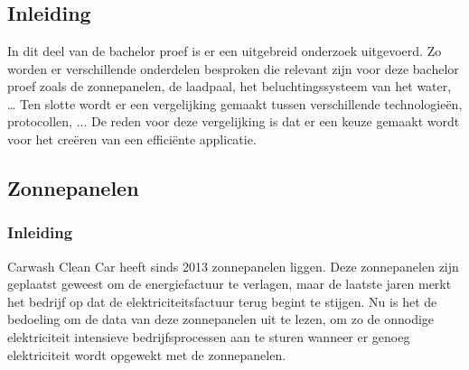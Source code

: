 \chapter{}%
\label{ch:stand-van-zaken}



\section{Inleiding}
\label{sec:stand-van-zaken-inleiding}

In dit deel van de bachelor proef is er een uitgebreid onderzoek uitgevoerd. Zo worden er verschillende onderdelen besproken die relevant zijn voor deze bachelor proef zoals de zonnepanelen, de laadpaal, het beluchtingssysteem van het water, … Ten slotte wordt er een vergelijking gemaakt tussen verschillende technologieën, protocollen, ... De reden voor deze vergelijking is dat er een keuze gemaakt wordt voor het creëren van een efficiënte applicatie.

\section{Zonnepanelen}
\label{sec:stand-van-zaken-zonnepanelen}

\subsection{Inleiding}
\label{sec:stand-van-zaken-zonnepanelen-inleiding}

Carwash Clean Car heeft sinds 2013 zonnepanelen liggen. Deze zonnepanelen zijn geplaatst geweest om de energiefactuur te verlagen, maar de laatste jaren merkt het bedrijf op dat de elektriciteitsfactuur terug begint te stijgen. Nu is het de bedoeling om de data van deze zonnepanelen uit te lezen, om zo de onnodige elektriciteit intensieve bedrijfsprocessen aan te sturen wanneer er genoeg elektriciteit wordt opgewekt met de zonnepanelen.
